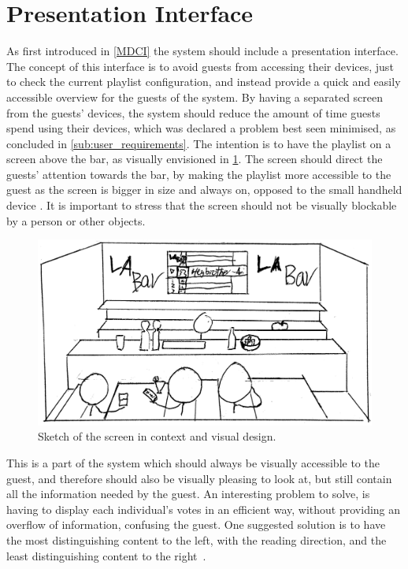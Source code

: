 \section{Presentation Interface}
As first introduced in \cref{MDCI} the system should include a
presentation interface. The concept of this interface is to avoid
guests from accessing their devices, just to check the current
playlist configuration, and instead provide a quick and easily accessible overview for the guests of the system. By having a separated screen from the guests' devices, the system should reduce the amount of time guests spend using their devices, which was declared a problem best seen minimised, as concluded in \cref{sub:user_requirements}. The intention is to have the playlist on a screen above the bar, as visually envisioned in \cref{fig:PresentationInterface}. The screen should direct the guests' attention towards the bar, by making the playlist more accessible to the guest as the screen is bigger in size and always on, opposed to the small handheld device \cite{DEB}. It is important to stress that the screen should not be visually blockable by a person or other objects.

\begin{figure}[hbtp]
  \centering
  \includegraphics[width=1.0\linewidth]{Images/presentation.png}
  \caption{Sketch of the screen in context and visual design.}\label{fig:PresentationInterface}
\end{figure}

This is a part of the system which should always be visually
accessible to the guest, and therefore should also be visually
pleasing to look at, but still contain all the information needed by
the guest. An interesting problem to solve, is having to display each
individual's votes in an efficient way, without providing an overflow
of information, confusing the guest. One suggested solution is to have
the most distinguishing content to the left, with the reading
direction, and the least distinguishing content to the
right~\cite{material}.

